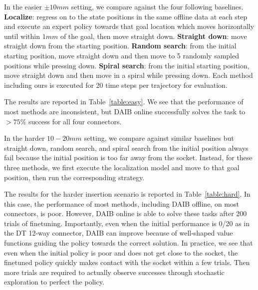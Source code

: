 In the easier $\pm10mm$ setting, we compare against the four following baselines. \textbf{Localize}: regress on to the state positions in the same offline data at each step and execute an expert policy towards that goal location which moves horizontally until within $1mm$ of the goal, then move straight down. \textbf{Straight down}: move straight down from the starting position. \textbf{Random search}: from the initial starting position, move straight down and then move to 5 randomly sampled positions while pressing down. \textbf{Spiral search}: from the initial starting position, move straight down and then move in a spiral while pressing down. Each method including ours is executed for 20 time steps per trajectory for evaluation.

The results are reported in Table~\ref{table:easy}. We see that the performance of most methods are inconsistent, but DAIB online successfully solves the task to $>75\%$ success for all four connectors.

In the harder $10-20mm$ setting, we compare against similar baselines but straight down, random search, and spiral search from the initial position always fail because the initial position is too far away from the socket. Instead, for these three methods, we first execute the localization model and move to that goal position, then run the corresponding strategy.

The results for the harder insertion scenario is reported in Table~\ref{table:hard}. In this case, the performance of most methods, including DAIB offline, on most connectors, is poor. However, DAIB online is able to solve these tasks after 200 trials of finetuning. Importantly, even when the initial performance is 0/20 as in the DT 12-way connector, DAIB can improve because of well-shaped value functions guiding the policy towards the correct solution. In practice, we see that even when the initial policy is poor and does not get close to the socket, the finetuned policy quickly makes contact with the socket within a few trials. Then more trials are required to actually observe successes through stochastic exploration to perfect the policy.





